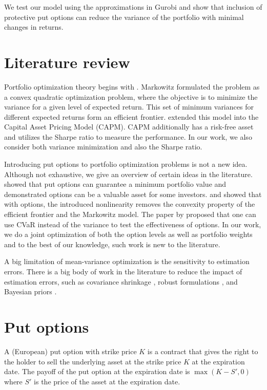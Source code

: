 \documentclass[11pt]{article}
\begin{document}
We test our model using the approximations in Gurobi and show that inclusion of protective put options can reduce the variance of the portfolio with minimal changes in returns.


\section{Literature review}

Portfolio optimization theory begins with \cite{markowitz1952}. Markowitz formulated the problem as a convex quadratic optimization problem, where the objective is to minimize the variance for a given level of expected return. This set of minimum variances for different expected returns form an efficient frontier. \cite{sharpe1964} extended this model into the Capital Asset Pricing Model (CAPM). CAPM additionally has a risk-free asset and utilizes the Sharpe ratio to measure the performance. In our work, we also consider both variance minimization and also the Sharpe ratio.

Introducing put options to portfolio optimization problems is not a new idea. Although not exhaustive, we give an overview of certain ideas in the literature. \cite{leland1980} showed that put options can guarantee a minimum portfolio value and demonstrated options can be a valuable asset for some investors. \cite{ahn1999} and \cite{haugh2001} showed that with options, the introduced nonlinearity removes the convexity property of the efficient frontier and the Markowitz model. The paper by \cite{alexander2006} proposed that one can use CVaR instead of the variance to test the effectiveness of options. In our work, we do a joint optimization of both the option levels as well as portfolio weights and to the best of our knowledge, such work is new to the literature.

A big limitation of mean-variance optimization is the sensitivity to estimation errors. There is a big body of work in the literature to reduce the impact of estimation errors, such as covariance shrinkage \cite{ledoit2004}, robust formulations \cite{goldfarb2003}, and Bayesian priors \cite{black1992}.

\section{Put options}\label{sec:putoptions}

A (European) put option with strike price $K$ is a contract that gives the right to the holder to sell the underlying asset at the strike price $K$ at the expiration date. The payoff of the put option at the expiration date is $\max(K - S', 0)$ where $S'$ is the price of the asset at the expiration date.
\end{document}

